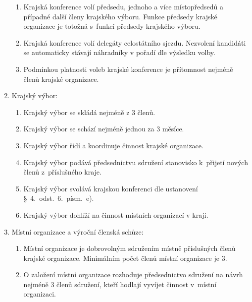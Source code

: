 \documentclass[a4paper]{article}
\begin{document}
\begin{enumerate}
\begin{enumerate}
        \item Krajská konference volí předsedu, jednoho a více místopředsedů a případné další členy krajského výboru.
            Funkce předsedy krajské organizace je totožná s~funkcí předsedy
            krajského výboru.

        \item Krajská konference volí delegáty celostátního sjezdu. Nezvolení
            kandidáti se automaticky stávají náhradníky v pořadí dle výsledku
            volby.

        \item Podmínkou platnosti voleb krajské konference je přítomnost
            nejméně  členů krajské organizace.
        \end{enumerate}

    \item Krajský výbor:
        \begin{enumerate}
        \item Krajský výbor se skládá nejméně z 3 členů.

        \item Krajský výbor se schází nejméně jednou za 3 měsíce.

        \item Krajský výbor řídí a koordinuje činnost krajské organizace.

        \item Krajský výbor podává předsednictvu sdružení stanovisko k~přijetí
            nových členů z~příslušného kraje.

        \item Krajský výbor svolává krajskou konferenci dle ustanovení
            \S~4.~odst.~6.~písm.~e).

        \item Krajský výbor dohlíží na činnost místních organizací v kraji.
        \end{enumerate}

    \item Místní organizace a výroční členská schůze:
        \begin{enumerate}
        \item Místní organizace je dobrovolným sdružením místně příslušných
            členů krajské organizace. Minimálním počet členů místní organizace
            je 3.

        \item O založení místní organizace rozhoduje předsednictvo sdružení na
            návrh nejméně 3 členů sdružení, kteří hodlají vyvíjet činnost
            v~místní organizaci.


\end{enumerate}
\end{enumerate}
\end{document}

